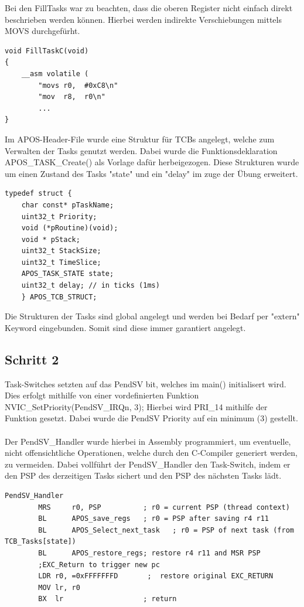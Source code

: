 \documentclass[12pt,naustrian,a4widepaper]{scrartcl}
\begin{document}
Bei den FillTasks war zu beachten, dass die oberen Register nicht einfach direkt beschrieben werden können.
Hierbei werden indirekte Verschiebungen mittels MOVS durchgefürht.\\
\begin{lstlisting}[basicstyle=\ttfamily\footnotesize,breaklines=true,frame=single,label=regular_loop]
void FillTaskC(void)
{
    __asm volatile (
        "movs r0,  #0xC8\n"
        "mov  r8,  r0\n"
        ...
}
\end{lstlisting}

Im APOS-Header-File wurde eine Struktur für TCBs angelegt, welche zum Verwalten der Tasks genutzt werden.
Dabei wurde die Funktionsdeklaration APOS\_TASK\_Create() als Vorlage dafür herbeigezogen.
Diese Strukturen wurde um einen Zustand des Tasks "state" und ein "delay" im zuge der Übung erweitert.

\begin{lstlisting}[basicstyle=\ttfamily\footnotesize,breaklines=true,frame=single,label=tcb_struct]
  typedef struct {
    char const* pTaskName;
    uint32_t Priority;
    void (*pRoutine)(void);
    void * pStack;
    uint32_t StackSize;
    uint32_t TimeSlice;
    APOS_TASK_STATE state;
    uint32_t delay; // in ticks (1ms)
    } APOS_TCB_STRUCT;
  \end{lstlisting}
  
  
Die Strukturen der Tasks sind global angelegt und werden bei Bedarf per "extern" Keyword eingebunden.
Somit sind diese immer garantiert angelegt.

\subsection{Schritt 2}
Task-Switches setzten auf das PendSV bit, welches im main() initialisert wird.
Dies erfolgt mithilfe von einer vordefinierten Funktion NVIC\_SetPriority(PendSV\_IRQn, 3);
Hierbei wird PRI\_14 mithilfe der Funktion gesetzt.
Dabei wurde die PendSV Priority auf ein minimum (3) gestellt.
\\
\\
Der PendSV\_Handler wurde hierbei in Assembly programmiert, um eventuelle, nicht offensichtliche Operationen, welche durch den C-Compiler generiert werden, zu vermeiden.
Dabei vollführt der PendSV\_Handler den Task-Switch, indem er den PSP des derzeitigen Tasks sichert und den PSP des nächsten Tasks lädt.
\begin{lstlisting}[basicstyle=\ttfamily\footnotesize,breaklines=true,frame=single,label=pendsv_handler]
PendSV_Handler
        MRS     r0, PSP          ; r0 = current PSP (thread context)
        BL      APOS_save_regs   ; r0 = PSP after saving r4 r11
        BL      APOS_Select_next_task   ; r0 = PSP of next task (from TCB_Tasks[state])
        BL      APOS_restore_regs; restore r4 r11 and MSR PSP
        ;EXC_Return to trigger new pc
        LDR r0, =0xFFFFFFFD       ;  restore original EXC_RETURN
        MOV lr, r0
        BX  lr                   ; return
\end{lstlisting}
\end{document}
